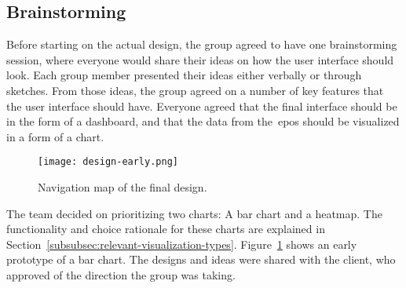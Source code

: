 \subsection{Brainstorming}\label{subsec:brainstorming}

Before starting on the actual design, the group agreed to have one brainstorming session, where everyone would share
their ideas on how the user interface should look.
Each group member presented their ideas either verbally or through sketches.
From those ideas, the group agreed on a number of key features that the user interface should have.
Everyone agreed that the final interface should be in the form of a dashboard, and that the data from
the~\acrshort{epos} should be visualized in a form of a chart.

\begin{figure}[H]
    \centering
    \texttt{[image: design-early.png]}
    \caption{Navigation map of the final design.
    }\label{fig:design-early}
\end{figure}

The team decided on prioritizing two charts: A bar chart and a heatmap.
The functionality and choice rationale for these charts are explained in
Section~\ref{subsubsec:relevant-visualization-types}.
Figure~\ref{fig:design-early} shows an early prototype of a bar chart.
The designs and ideas were shared with the client, who approved of the direction the group was taking.

